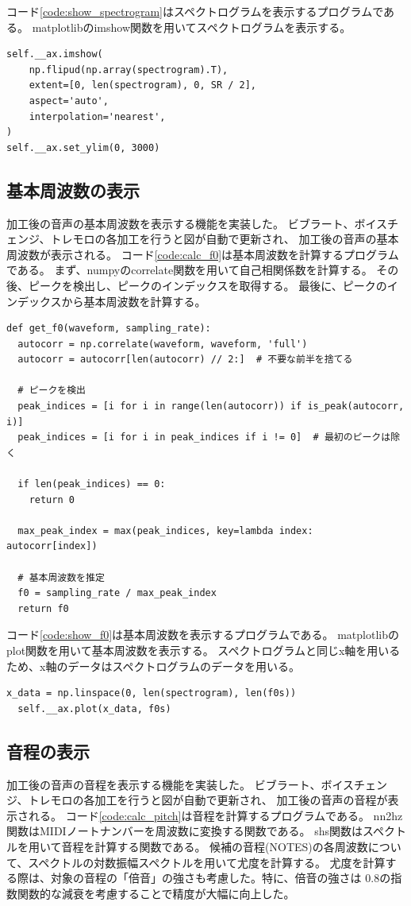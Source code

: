 \documentclass[a4paper,11pt]{jsarticle}
\begin{document}
コード\ref{code:show_spectrogram}はスペクトログラムを表示するプログラムである。
matplotlibのimshow関数を用いてスペクトログラムを表示する。
\begin{lstlisting}[caption=スペクトログラム表示,label=code:show_spectrogram]
self.__ax.imshow(
    np.flipud(np.array(spectrogram).T),
    extent=[0, len(spectrogram), 0, SR / 2],
    aspect='auto',
    interpolation='nearest',
)
self.__ax.set_ylim(0, 3000)
\end{lstlisting}

\subsection{基本周波数の表示}
加工後の音声の基本周波数を表示する機能を実装した。
ビブラート、ボイスチェンジ、トレモロの各加工を行うと図が自動で更新され、
加工後の音声の基本周波数が表示される。
コード\ref{code:calc_f0}は基本周波数を計算するプログラムである。
まず、numpyのcorrelate関数を用いて自己相関係数を計算する。
その後、ピークを検出し、ピークのインデックスを取得する。
最後に、ピークのインデックスから基本周波数を計算する。

\begin{lstlisting}[caption=基本周波数計算,label=code:calc_f0]
def get_f0(waveform, sampling_rate):
  autocorr = np.correlate(waveform, waveform, 'full')
  autocorr = autocorr[len(autocorr) // 2:]  # 不要な前半を捨てる

  # ピークを検出
  peak_indices = [i for i in range(len(autocorr)) if is_peak(autocorr, i)]
  peak_indices = [i for i in peak_indices if i != 0]  # 最初のピークは除く

  if len(peak_indices) == 0:
    return 0

  max_peak_index = max(peak_indices, key=lambda index: autocorr[index])

  # 基本周波数を推定
  f0 = sampling_rate / max_peak_index
  return f0
\end{lstlisting}

コード\ref{code:show_f0}は基本周波数を表示するプログラムである。
matplotlibのplot関数を用いて基本周波数を表示する。
スペクトログラムと同じx軸を用いるため、x軸のデータはスペクトログラムのデータを用いる。

\begin{lstlisting}[caption=基本周波数表示,label=code:show_f0]
  x_data = np.linspace(0, len(spectrogram), len(f0s))
  self.__ax.plot(x_data, f0s)
\end{lstlisting}

\subsection{音程の表示}
加工後の音声の音程を表示する機能を実装した。
ビブラート、ボイスチェンジ、トレモロの各加工を行うと図が自動で更新され、
加工後の音声の音程が表示される。
コード\ref{code:calc_pitch}は音程を計算するプログラムである。
nn2hz関数はMIDIノートナンバーを周波数に変換する関数である。
shs関数はスペクトルを用いて音程を計算する関数である。
候補の音程(NOTES)の各周波数について、スペクトルの対数振幅スペクトルを用いて尤度を計算する。
尤度を計算する際は、対象の音程の「倍音」の強さも考慮した。特に、倍音の強さは
0.8の指数関数的な減衰を考慮することで精度が大幅に向上した。
\end{document}
